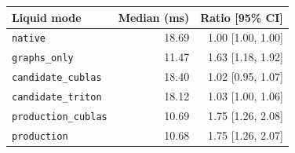 \begin{tabular}{lrr}
\toprule
Liquid mode & Median (ms) & Ratio [95\% CI] \\
\midrule
\texttt{native} & 18.69 & 1.00 [1.00, 1.00] \\
\texttt{graphs\_only} & 11.47 & 1.63 [1.18, 1.92] \\
\texttt{candidate\_cublas} & 18.40 & 1.02 [0.95, 1.07] \\
\texttt{candidate\_triton} & 18.12 & 1.03 [1.00, 1.06] \\
\texttt{production\_cublas} & 10.69 & 1.75 [1.26, 2.08] \\
\texttt{production} & 10.68 & 1.75 [1.26, 2.07] \\
\bottomrule
\end{tabular}
